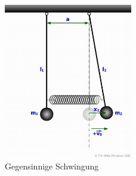 \begin{figure}[H]
  \centering
  \includegraphics[width=0.5\textwidth]{graphics/gekoppelt.jpg}
  \caption{Gegensinnige Schwingung \cite{fhaachen}}
\end{figure}
